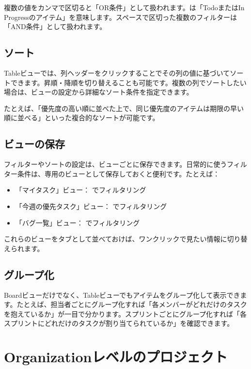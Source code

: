 複数の値をカンマで区切ると「OR条件」として扱われます。は「TodoまたはIn Progressのアイテム」を意味します。スペースで区切った複数のフィルターは「AND条件」として扱われます。

\subsection{ソート}

Tableビューでは、列ヘッダーをクリックすることでその列の値に基づいてソートできます。昇順・降順を切り替えることも可能です。複数の列でソートしたい場合は、ビューの設定から詳細なソート条件を指定できます。

たとえば、「優先度の高い順に並べた上で、同じ優先度のアイテムは期限の早い順に並べる」といった複合的なソートが可能です。

\subsection{ビューの保存}

フィルターやソートの設定は、ビューごとに保存できます。日常的に使うフィルター条件は、専用のビューとして保存しておくと便利です。たとえば：

\begin{itemize}
  \item 「マイタスク」ビュー： でフィルタリング
  \item 「今週の優先タスク」ビュー： でフィルタリング
  \item 「バグ一覧」ビュー： でフィルタリング
\end{itemize}

これらのビューをタブとして並べておけば、ワンクリックで見たい情報に切り替えられます。

\subsection{グループ化}

Boardビューだけでなく、Tableビューでもアイテムをグループ化して表示できます。たとえば、担当者ごとにグループ化すれば「各メンバーがどれだけのタスクを抱えているか」が一目で分かります。スプリントごとにグループ化すれば「各スプリントにどれだけのタスクが割り当てられているか」を確認できます。

\section{Organizationレベルのプロジェクト}

